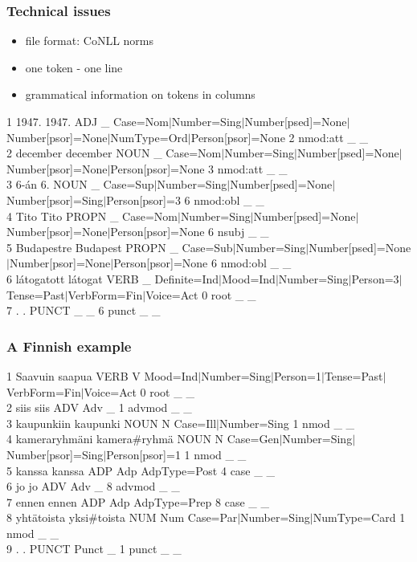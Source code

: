 \documentclass{beamer}
\begin{document}
\begin{frame}
\frametitle{Technical issues}
\begin{itemize}
\item file format: CoNLL norms
\item one token - one line
\item grammatical information on tokens in columns
\end{itemize}

\tiny
1	1947.	1947.	ADJ	\_	Case=Nom$\vert$Number=Sing$\vert$Number[psed]=None$\vert$Number[psor]=None$\vert$NumType=Ord$\vert$Person[psor]=None	2	nmod:att	\_	\_ \\
2	december	december	NOUN	\_	Case=Nom$\vert$Number=Sing$\vert$Number[psed]=None$\vert$Number[psor]=None$\vert$Person[psor]=None	3	nmod:att	\_	\_ \\
3	6-án	6.	NOUN	\_	Case=Sup$\vert$Number=Sing$\vert$Number[psed]=None$\vert$Number[psor]=Sing$\vert$Person[psor]=3	6	nmod:obl	\_	\_ \\
4	Tito	Tito	PROPN	\_	Case=Nom$\vert$Number=Sing$\vert$Number[psed]=None$\vert$Number[psor]=None$\vert$Person[psor]=None	6	nsubj	\_	\_ \\
5	Budapestre	Budapest	PROPN	\_	Case=Sub$\vert$Number=Sing$\vert$Number[psed]=None$\vert$Number[psor]=None$\vert$Person[psor]=None	6	nmod:obl	\_	\_ \\
6	l\'atogatott	l\'atogat	VERB	\_	Definite=Ind$\vert$Mood=Ind$\vert$Number=Sing$\vert$Person=3$\vert$Tense=Past$\vert$VerbForm=Fin$\vert$Voice=Act	0	root	\_	\_ \\
7	.	.	PUNCT	\_	\_	6	punct	\_	\_ \\

\end{frame}

\begin{frame}
\frametitle{A Finnish example}
\footnotesize
1	Saavuin	saapua	VERB	V	Mood=Ind$\vert$Number=Sing$\vert$Person=1$\vert$Tense=Past$\vert$VerbForm=Fin$\vert$Voice=Act	0	root	\_	\_ \\
2	siis	siis	ADV	Adv	\_	1	advmod	\_	\_ \\
3	kaupunkiin	kaupunki	NOUN	N	Case=Ill$\vert$Number=Sing	1	nmod	\_	\_ \\
4	kameraryhm\"ani	kamera\#ryhm\"a	NOUN	N	Case=Gen$\vert$Number=Sing$\vert$Number[psor]=Sing$\vert$Person[psor]=1	1	nmod	\_	\_ \\
5	kanssa	kanssa	ADP	Adp	AdpType=Post	4	case	\_	\_ \\
6	jo	jo	ADV	Adv	\_	8	advmod	\_	\_ \\
7	ennen	ennen	ADP	Adp	AdpType=Prep	8	case	\_	\_ \\
8	yht\"atoista	yksi\#toista	NUM	Num	Case=Par$\vert$Number=Sing$\vert$NumType=Card	1	nmod	\_	\_ \\
9	.	.	PUNCT	Punct	\_	1	punct	\_	\_ \\
\end{frame}
\end{document}
